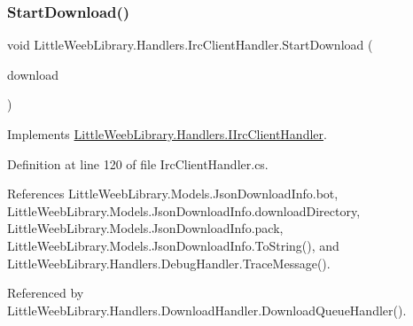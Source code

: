 \subsubsection{\texorpdfstring{Start\+Download()}{StartDownload()}}
{\footnotesize\ttfamily void Little\+Weeb\+Library.\+Handlers.\+Irc\+Client\+Handler.\+Start\+Download (\begin{DoxyParamCaption}\item[{\mbox{\hyperlink{class_little_weeb_library_1_1_models_1_1_json_download_info}{Json\+Download\+Info}}}]{download }\end{DoxyParamCaption})}



Implements \mbox{\hyperlink{interface_little_weeb_library_1_1_handlers_1_1_i_irc_client_handler_af14486a1ffa0b1d4ab3058f442ee9d6a}{Little\+Weeb\+Library.\+Handlers.\+I\+Irc\+Client\+Handler}}.



Definition at line 120 of file Irc\+Client\+Handler.\+cs.



References Little\+Weeb\+Library.\+Models.\+Json\+Download\+Info.\+bot, Little\+Weeb\+Library.\+Models.\+Json\+Download\+Info.\+download\+Directory, Little\+Weeb\+Library.\+Models.\+Json\+Download\+Info.\+pack, Little\+Weeb\+Library.\+Models.\+Json\+Download\+Info.\+To\+String(), and Little\+Weeb\+Library.\+Handlers.\+Debug\+Handler.\+Trace\+Message().



Referenced by Little\+Weeb\+Library.\+Handlers.\+Download\+Handler.\+Download\+Queue\+Handler().


